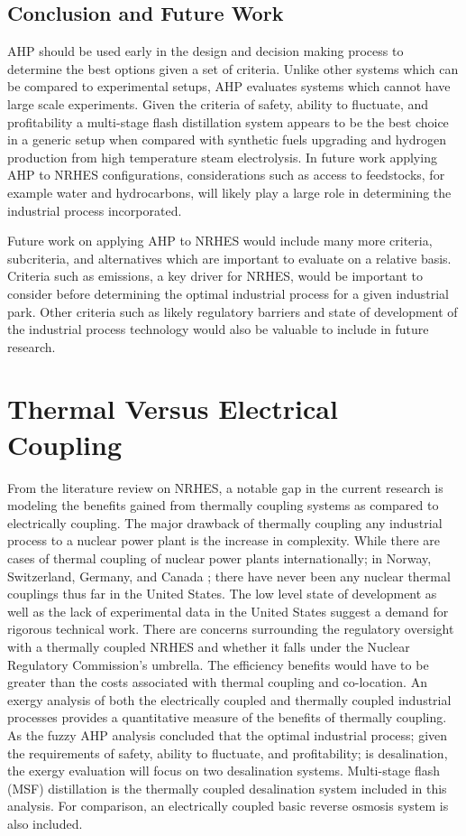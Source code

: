 \documentclass[12pt]{UIdahoMastersThesis}
\begin{document}
\newpage
\section{Conclusion and Future Work}

AHP should be used early in the design and decision making process to determine the best options given a set of criteria. Unlike other systems which can be compared to experimental setups, AHP evaluates systems which cannot have large scale experiments. Given the criteria of safety, ability to fluctuate, and profitability a multi-stage flash distillation system appears to be the best choice in a generic setup when compared with synthetic fuels upgrading and hydrogen production from high temperature steam electrolysis. In future work applying AHP to NRHES configurations, considerations such as access to feedstocks, for example water and hydrocarbons, will likely play a large role in determining the industrial process incorporated.

 Future work on applying AHP to NRHES would include many more criteria, subcriteria, and alternatives which are important to evaluate on a relative basis.  Criteria such as emissions, a key driver for NRHES, would be important to consider before determining the optimal industrial process for a given industrial park. Other criteria such as likely regulatory barriers and state of development of the industrial process technology would also be valuable to include in future research.

\chapter{Thermal Versus Electrical Coupling}
From the literature review on NRHES, a notable gap in the current research is modeling the benefits gained from thermally coupling systems as compared to electrically coupling. The major drawback of thermally coupling any industrial process to a nuclear power plant is the increase in complexity. While there are cases of thermal coupling of nuclear power plants internationally; in Norway, Switzerland, Germany, and Canada \cite{Verfondern};  there have never been any nuclear thermal couplings thus far in the United States.  The low level state of development as well as the lack of experimental data in the United States suggest a demand for rigorous technical work.  There are concerns surrounding the regulatory oversight with a thermally coupled NRHES and whether it falls under the Nuclear Regulatory Commission's umbrella. The efficiency benefits would have to be greater than the costs associated with thermal coupling and co-location.  An exergy analysis of both the electrically coupled and thermally coupled industrial processes provides a quantitative measure of the benefits of thermally coupling. As the fuzzy AHP analysis concluded that the optimal industrial process; given the requirements of safety, ability to fluctuate, and profitability; is desalination, the exergy evaluation will focus on two desalination systems.  Multi-stage flash (MSF) distillation is the thermally coupled desalination system included in this analysis. For comparison, an electrically coupled basic reverse osmosis system is also included.
\end{document}
